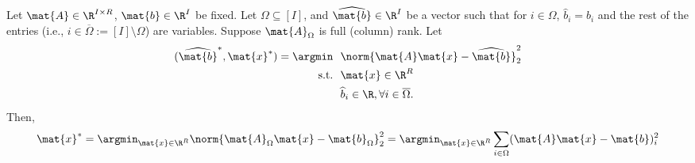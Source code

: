 




























\iffalse
{}

\begin{lemma}
\label{lemma:old-lifting}
Let $\mat{A}\in\R^{I\times R}$, $\mat{b} \in \R^I$ be fixed.
Let $\Omega\subseteq [I]$, and $\widehat{\mat{b}} \in \R^{I}$ be a vector such that for $i\in \Omega$, $\widehat{b}_{i}=b_{i}$ and the rest of the entries (i.e., $i\in\overline{\Omega} := [I] \setminus \Omega$) are variables. Suppose $\mat{A}_\Omega$ is full (column) rank. Let
    \begin{align}
    \label{eq:prox_problem}
        (\widehat{\mat{b}}^*, \mat{x}^*) = \argmin & ~~ \norm{\mat{A} \mat{x} - \widehat{\mat{b}}}_2^2
        \\ \nonumber \text{s.t.} & ~~
        \mat{x} \in\R^{R}
        \\ \nonumber & ~~ 
        \widehat{b}_{i} \in \R, \forall i \in \overline{\Omega}.
    \end{align}
Then,
\[
    \mat{x}^* = \argmin_{\mat{x}\in\R^R} \norm{\mat{A}_{\Omega} \mat{x} - \mat{b}_{\Omega}}_{2}^2 =  \argmin_{\mat{x}\in\R^R} \sum_{i\in \Omega} (\mat{A} \mat{x} - \mat{b})_i^2
\]
\end{lemma}


